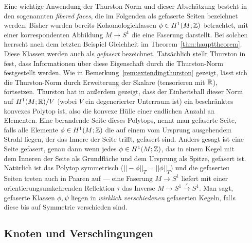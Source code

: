     \begin{bsp}
    \label{ex:fiberedfaces}
        Eine wichtige Anwendung der Thurston-Norm und dieser Abschätzung besteht in den sogenannten \textit{fibered faces}, die im Folgenden als gefaserte Seiten bezeichnet werden. Bisher wurden bereits Kohomologieklassen $\phi \in H^1(M;\mathbb{Z})$ betrachtet, mit einer korrespondenten Abbildung $M \to S^1$ die eine Faserung darstellt. Bei solchen herrscht nach dem letzten Beispiel Gleichheit im Theorem~\ref{thm:haupttheorem}. Diese Klassen werden auch als \textit{gefasert} bezeichnet. Tatsächlich stellt Thurston in \cite{Thurston.1986} fest, dass Informationen über diese Eigenschaft durch die Thurston-Norm festgestellt werden. Wie in Bemerkung~\ref{rem:extendingthurston} gezeigt, lässt sich die Thurston-Norm durch Erweiterung der Skalare (tensorieren mit $\mathbb{R}$), fortsetzen. Thurston hat in \cite{Thurston.1986} außerdem gezeigt, dass der Einheitsball dieser Norm auf $H^1(M;\mathbb{R})/V$ (wobei $V$ ein degenerierter Unterraum ist) ein beschränktes konvexes Polytop ist, also die konvexe Hülle einer endlichen Anzahl an Elementen. Eine berandende Seite dieses Polytops, nennt man gefaserte Seite, falls alle Elemente $\phi \in H^1(M;\mathbb{Z})$ die auf einem vom Ursprung ausgehendem Strahl liegen, der das Innere der Seite trifft, gefasert sind. Anders gesagt ist eine Seite gefasert, genau dann wenn jedes $\phi \in H^1(M;\mathbb{Z})$, das in einem Kegel mit dem Inneren der Seite als Grundfläche und dem Ursprung als Spitze, gefasert ist. Natürlich ist das Polytop symmetrisch ($||-\phi||_T=||\phi||_T$) und die gefaserten Seiten treten auch in Paaren auf --- eine Faserung $M \to S^1$ liefert mit einer orientierungsumkehrenden Reflektion $\tau$ das Inverse $M \to S^1 \stackrel \tau \to S^1$. Man sagt, gefaserte Klassen $\phi,\psi$ liegen in \textit{wirklich verschiedenen} gefaserten Kegeln, falls diese bis auf Symmetrie verschieden sind. 
    \end{bsp}


    \subsection{Knoten und Verschlingungen}
    \label{sec:links}


